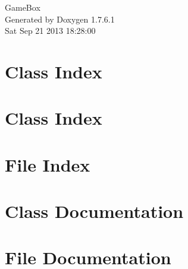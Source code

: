 \documentclass[a4paper]{book}
\begin{document}
\hypersetup{pageanchor=false,citecolor=blue}
\begin{titlepage}
\vspace*{7cm}
\begin{center}
{\Large \-Game\-Box }\\
\vspace*{1cm}
{\large \-Generated by Doxygen 1.7.6.1}\\
\vspace*{0.5cm}
{\small Sat Sep 21 2013 18:28:00}\\
\end{center}
\end{titlepage}
\clearemptydoublepage
{}
\tableofcontents
\clearemptydoublepage
{}
\hypersetup{pageanchor=true,citecolor=blue}
\chapter{\-Class \-Index}

\chapter{\-Class \-Index}

\chapter{\-File \-Index}

\chapter{\-Class \-Documentation}
























\chapter{\-File \-Documentation}



























\printindex
\end{document}
